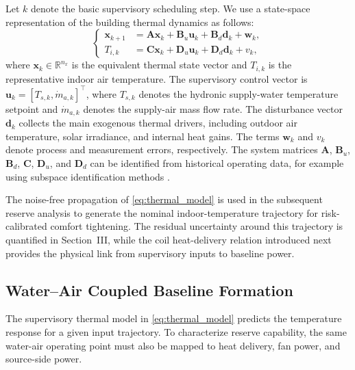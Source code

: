 \documentclass[journal]{IEEEtran}
\theoremstyle{remark}
\begin{document}
Let \(k\) denote the basic supervisory scheduling step. We use a state-space representation of the building thermal dynamics as follows\cite{rousseau2025uncertainty}:
\begin{equation}
	\left\{
	\begin{aligned}
		\mathbf{x}_{k+1} &= \mathbf{A}\mathbf{x}_{k}
		+ \mathbf{B}_{u}\mathbf{u}_{k}
		+ \mathbf{B}_{d}\mathbf{d}_{k}
		+ \mathbf{w}_{k}, \\
		T_{i,k} &= \mathbf{C}\mathbf{x}_{k}
		+ \mathbf{D}_{u}\mathbf{u}_{k}
		+ \mathbf{D}_{d}\mathbf{d}_{k}
		+ v_{k},
	\end{aligned}
	\right.
	\label{eq:thermal_model}
\end{equation}
where \(\mathbf{x}_{k}\in\mathbb{R}^{n_x}\) is the equivalent thermal state vector and \(T_{i,k}\) is the representative indoor air temperature. The supervisory control vector is
\(\mathbf{u}_{k}=[T_{s,k},\dot m_{a,k}]^{\top}\), where \(T_{s,k}\) denotes the hydronic supply-water temperature setpoint and \(\dot m_{a,k}\) denotes the supply-air mass flow rate. The disturbance vector \(\mathbf{d}_{k}\) collects the main exogenous thermal drivers, including outdoor air temperature, solar irradiance, and internal heat gains. The terms \(\mathbf{w}_k\) and \(v_k\) denote process and measurement errors, respectively. The system matrices \(\mathbf{A}\), \(\mathbf{B}_{u}\), \(\mathbf{B}_{d}\), \(\mathbf{C}\), \(\mathbf{D}_{u}\), and \(\mathbf{D}_{d}\) can be identified from historical operating data, for example using subspace identification methods \cite{overschee1996subspace}.

The noise-free propagation of \eqref{eq:thermal_model} is used in the subsequent reserve analysis to generate the nominal indoor-temperature trajectory for risk-calibrated comfort tightening. The residual uncertainty around this trajectory is quantified in Section~III, while the coil heat-delivery relation introduced next provides the physical link from supervisory inputs to baseline power.

\subsection{Water--Air Coupled Baseline Formation}

The supervisory thermal model in \eqref{eq:thermal_model} predicts the temperature response for a given input trajectory. To characterize reserve capability, the same water-air operating point must also be mapped to heat delivery, fan power, and source-side power.
\end{document}

